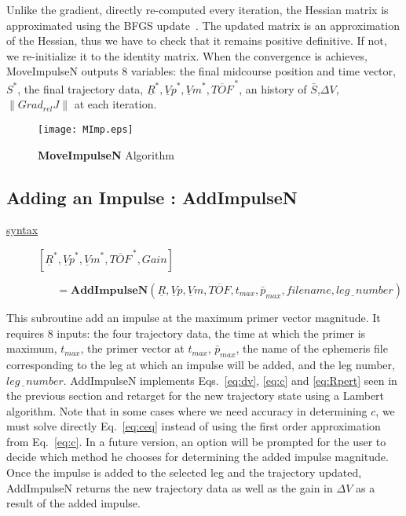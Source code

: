 \documentclass[12pt]{report}
\begin{document}
\noindent Unlike the gradient, directly re-computed every
iteration, the Hessian matrix is approximated using the BFGS
update~\cite{Rao96}. The updated matrix is an approximation of the
Hessian, thus we have to check that it remains positive
definitive. If not, we re-initialize it to the identity matrix.
When the convergence is achieves, MoveImpulseN outputs 8
variables: the final midcourse position and time vector, $S^{*}$,
the final trajectory data, $\underline{R}^{*},
{\underline{V}p}^{*},{\underline{V}m}^{*},{\overline{TOF}}^{\,*}$,
an history of $\bar S$,$\Delta V$, $\|Grad_{rel} J\|$ at each
iteration.

\begin{figure}
\centering
\texttt{[image: MImp.eps]}
\caption{\textbf{MoveImpulseN} Algorithm} \label{MImp}
\end{figure}

\subsection{Adding an Impulse : AddImpulseN}

\begin{description}
\item[\underline{syntax}]$[ \underline{R}^{*}, {\underline{V}p}^{*},{\underline{V}m}^{*},{\overline{TOF}}^{\,*}, Gain ]$
\item[]$\; \; \; \; \; \; = \textbf{AddImpulseN}( \underline{R}, \underline{V}p,\underline{V}m,\overline{TOF},t_{max},\bar p_{max},filename,leg\underline{\;\;}number)$
\end{description}

\noindent This subroutine add an impulse at the maximum primer
vector magnitude. It requires 8 inputs: the four trajectory data,
the time at which the primer is maximum, $t_{max}$, the primer
vector at $t_{max}$, $\bar p_{max}$, the name of the ephemeris
file corresponding to the leg at which an impulse will be added,
and the leg number, $leg\underline{\;\;}number$. AddImpulseN
implements Eqs.~\ref{eq:dv}, \ref{eq:c} and \ref{eq:Rpert} seen in
the previous section and retarget for the new trajectory state
using a Lambert algorithm. Note that in some cases where we need
accuracy in determining $c$, we must solve directly
Eq.~\ref{eq:ceq} instead of using the first order approximation
from Eq.~\ref{eq:c}. In a future version, an option will be
prompted for the user to decide which method he chooses for
determining the added impulse magnitude. Once the impulse is added
to the selected leg and the trajectory updated, AddImpulseN
returns the new trajectory data as well as the gain in $\Delta V$
as a result of the added impulse.
\end{document}

